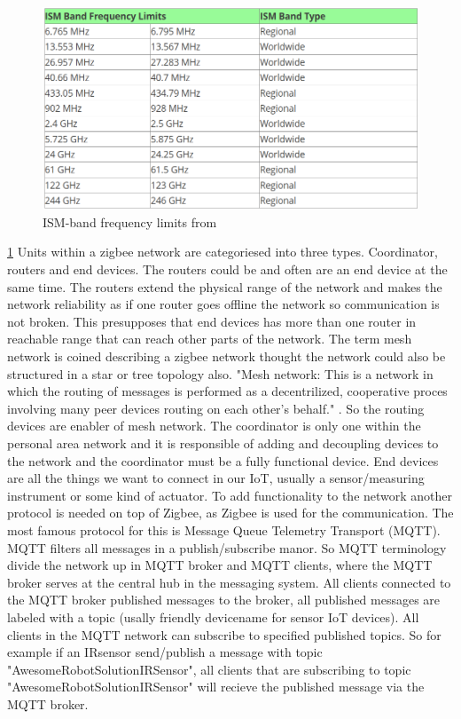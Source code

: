 \documentclass[article,a4paper]{IEEEtran}
\begin{document}
    \begin{figure}
        \includegraphics[width=\columnwidth]{ISM-band.png} 
        \caption{ISM-band frequency limits from \cite{ISM-band1}}
        \label{fig1:ISM-band frequency limits}   
    \end{figure}
    \ref{fig1:ISM-band frequency limits}
    Units within a zigbee network are categoriesed into three types. Coordinator, routers and end devices. The routers could be and often are an end device at the same time. The routers extend the physical range of the network and makes the network reliability as if one router goes offline the network so communication is not broken. This presupposes that end devices has more than one router in reachable range that can reach other parts of the network. The term mesh network is coined describing a zigbee network thought the network could also be structured in a star or tree topology also. "Mesh network: This is a network in which the routing of messages is performed as a decentrilized, cooperative proces involving many peer devices routing on each other's behalf." \cite{ZigbeeSpec}. So the routing devices are enabler of mesh network. The coordinator is only one within the personal area network and it is responsible of adding and decoupling devices to the network and the coordinator must be a fully functional device. End devices are all the things we want to connect in our IoT, usually a sensor/measuring instrument or some kind of actuator. 
    \newline\newline
    To add functionality to the network another protocol is needed on top of Zigbee, as Zigbee is used for the communication. The most famous protocol for this is Message Queue Telemetry Transport (MQTT). MQTT filters all messages in a publish/subscribe manor. So MQTT terminology divide the network up in MQTT broker and MQTT clients, where the MQTT broker serves at the central hub in the messaging system. All clients connected to the MQTT broker published messages to the broker, all published messages are labeled with a topic (usally friendly devicename for sensor IoT devices). All clients in the MQTT network can subscribe to specified published topics. So for example if an IRsensor send/publish a message with topic "AwesomeRobotSolutionIRSensor", all clients that are subscribing to topic "AwesomeRobotSolutionIRSensor" will recieve the published message via the MQTT broker.       
\end{document}
